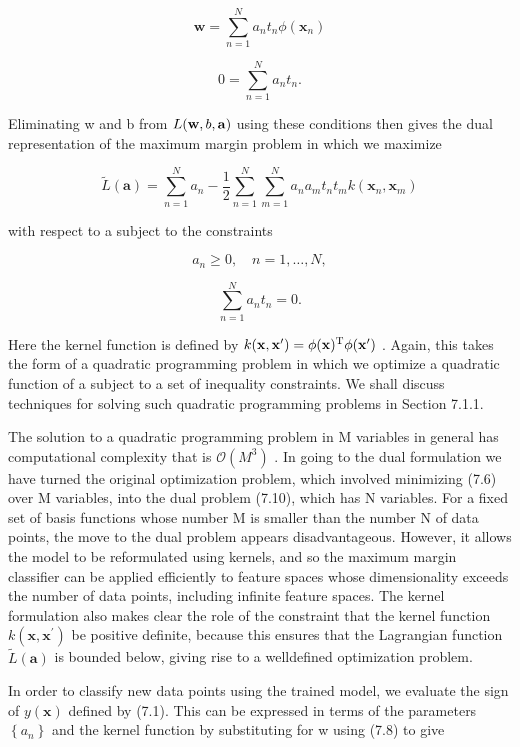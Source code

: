 \documentclass[
  10
]{article}
\begin{document}
\[
\mathbf {w} = \sum_ {n = 1} ^ {N} a _ {n} t _ {n} \phi (\mathbf {x} _ {n})\tag{7.8}
\]

\[
0 = \sum_ {n = 1} ^ {N} a _ {n} t _ {n}.\tag{7.9}
\]

Eliminating w and b from \(L ( { \bf w } , b , { \bf a } )\) using these
conditions then gives the dual representation of the maximum margin
problem in which we maximize

\[
\widetilde {L} (\mathbf {a}) = \sum_ {n = 1} ^ {N} a _ {n} - \frac {1}{2} \sum_ {n = 1} ^ {N} \sum_ {m = 1} ^ {N} a _ {n} a _ {m} t _ {n} t _ {m} k (\mathbf {x} _ {n}, \mathbf {x} _ {m})\tag{7.10}
\]

with respect to a subject to the constraints

\[
a _ {n} \geqslant 0, \quad n = 1, \dots , N,\tag{7.11}
\]

\[
\sum_ {n = 1} ^ {N} a _ {n} t _ {n} = 0.\tag{7.12}
\]

Here the kernel function is defined by
\(k ( { \bf x } , { \bf x } ^ { \prime } ) = \phi ( { \bf x } ) ^ { \mathrm { T } } \phi ( { \bf x } ^ { \prime } )\)
. Again, this takes the form of a quadratic programming problem in which
we optimize a quadratic function of a subject to a set of inequality
constraints. We shall discuss techniques for solving such quadratic
programming problems in Section 7.1.1.

The solution to a quadratic programming problem in M variables in
general has computational complexity that is
\(\mathcal { O } ( M ^ { 3 } )\) . In going to the dual formulation we
have turned the original optimization problem, which involved minimizing
(7.6) over M variables, into the dual problem (7.10), which has N
variables. For a fixed set of basis functions whose number M is smaller
than the number N of data points, the move to the dual problem appears
disadvantageous. However, it allows the model to be reformulated using
kernels, and so the maximum margin classifier can be applied efficiently
to feature spaces whose dimensionality exceeds the number of data
points, including infinite feature spaces. The kernel formulation also
makes clear the role of the constraint that the kernel function
\(k ( \mathbf { x } , \mathbf { x } ^ { \prime } )\) be positive
definite, because this ensures that the Lagrangian function
\(\widetilde L ( \mathbf { a } )\) is bounded below, giving rise to a
welldefined optimization problem.

In order to classify new data points using the trained model, we
evaluate the sign of \(y ( \mathbf x )\) defined by (7.1). This can be
expressed in terms of the parameters \(\left\{ a _ { n } \right\}\) and
the kernel function by substituting for w using (7.8) to give
\end{document}
